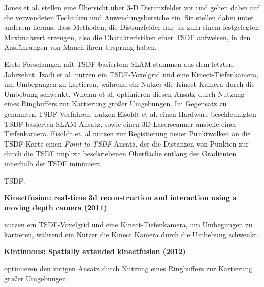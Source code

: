 Jones et al. \cite{jones2006distance} stellen eine Übersicht über 3-D Distanzfelder vor und gehen dabei auf die verwendeten Techniken und Anwendungsbereiche ein. Sie stellen dabei unter anderem heraus, dass Methoden, die Distanzfelder nur bis zum einem festgelegten Maximalwert erzeugen, also die Charakteristiken einer TSDF aufweisen, in den Ausführungen von Mauch \cite{mauch200fast, mauch2003efficient} ihren Ursprung haben.


Erste Forschungen mit TSDF basiertem SLAM stammen aus dem letzten Jahrzehnt.
Izadi et al. \cite{izadi2011kinectfusion} nutzen ein TSDF-Voxelgrid und eine Kinect-Tiefenkamera, um Umbegungen zu kartieren, während ein Nutzer die Kinect Kamera durch die Umbebung schwenkt.
Whelan et al. \cite{whelan2012kintinuous} optimieren diesen Ansatz durch Nutzung eines Ringbuffers zur Kartierung großer Umgebungen.
Im Gegensatz zu genannten TSDF Verfahren, nutzen Eisoldt et al. \cite{HATSDF} einen Hardware beschleunigten TSDF basierten SLAM Ansatz, sowie einen 3D-Laserscanner anstelle einer Tiefenkamera. Eisoldt et. al \cite{HATSDF} nutzen zur Registierung neuer Punktwolken an die TSDF Karte einen \emph{Point-to-TSDF} Ansatz, der die Distanzen von Punkten zur durch die TSDF implizit beschriebenen Oberfläche entlang des Gradienten innerhalb der TSDF minimiert.



TSDF:




\textbf{Kinectfusion: real-time 3d reconstruction and interaction using a moving depth camera (2011)} \cite{izadi2011kinectfusion}

\begin{description}
\item
nutzen ein TSDF-Voxelgrid und eine Kinect-Tiefenkamera, um Umbegungen zu kartieren, während ein Nutzer die Kinect Kamera durch die Umbebung schwenkt.
\end{description}


\textbf{Kintinuous: Spatially extended kinectfusion (2012)}\cite{whelan2012kintinuous}

\begin{description}
\item
optimieren den vorigen Ansatz durch Nutzung eines Ringbuffers zur Kartierung großer Umgebungen
\end{description}


